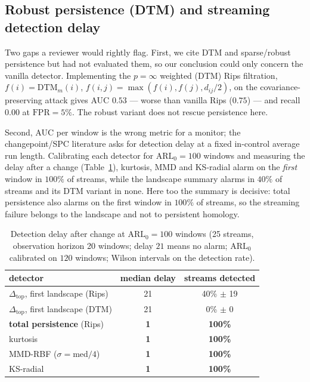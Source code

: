 \documentclass[11pt]{article}
\theoremstyle{remark}
\begin{document}
\subsection{Robust persistence (DTM) and streaming detection delay}\label{sec:dtm}
Two gaps a reviewer would rightly flag. First, we cite DTM and sparse/robust persistence but had
not evaluated them, so our conclusion could only concern the vanilla detector. Implementing the
$p=\infty$ weighted (DTM) Rips filtration, $f(i)=\mathrm{DTM}_m(i)$,
$f(i,j)=\max(f(i),f(j),d_{ij}/2)$, on the covariance-preserving attack gives AUC $0.53$ --- worse
than vanilla Rips ($0.75$) --- and recall $0.00$ at $\mathrm{FPR}=5\%$. The robust variant does not
rescue persistence here.

Second, AUC per window is the wrong metric for a monitor; the changepoint/SPC literature asks for
detection delay at a fixed in-control average run length. Calibrating each detector for
$\mathrm{ARL}_0=100$ windows and measuring the delay after a change (Table~\ref{tab:arl}), kurtosis,
MMD and KS-radial alarm on the \emph{first} window in $100\%$ of streams, while the landscape
summary alarms in $40\%$ of streams and its DTM variant in none. Here too the summary is decisive:
total persistence also alarms on the first window in $100\%$ of streams, so the streaming failure
belongs to the landscape and not to persistent homology.

\begin{table}[t]\centering
\caption{Detection delay after change at $\mathrm{ARL}_0=100$ windows (25 streams, observation
horizon 20 windows; delay $21$ means no alarm; $\mathrm{ARL}_0$ calibrated on $120$ windows;
Wilson intervals on the detection rate).}
\label{tab:arl}
\begin{tabular}{lcc}
\toprule
detector & median delay & streams detected\\
\midrule
$\Delta_{\mathrm{top}}$, first landscape (Rips) & 21 & 40\% $\pm$ 19\\
$\Delta_{\mathrm{top}}$, first landscape (DTM) & 21 & 0\% $\pm$ 0\\
\textbf{total persistence} (Rips) & \textbf{1} & \textbf{100\%}\\
kurtosis & \textbf{1} & \textbf{100\%}\\
MMD-RBF ($\sigma=$med$/4$) & \textbf{1} & \textbf{100\%}\\
KS-radial & \textbf{1} & \textbf{100\%}\\
\bottomrule
\end{tabular}
\end{table}
\end{document}

